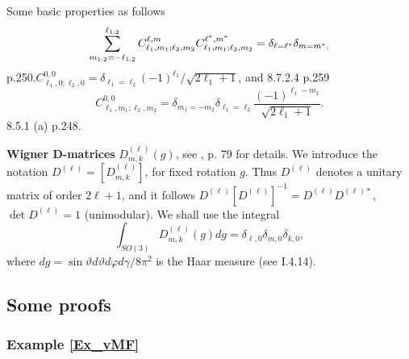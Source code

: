\documentclass[preprint,11pt,a4paper]{elsarticle}
\begin{document}
Some basic properties as follows 
\begin{equation*}
\sum_{m_{1:2}=-\ell_{1:2}}^{\ell_{1:2}}C_{\ell_{1},m_{1};\ell_{2},m_{2}}^{%
\ell,m}C_{\ell_{1},m_{1};\ell_{2},m_{2}}^{\ell^{\ast},m^{\ast}}=\delta
_{\ell=\ell^{\ast}}\delta_{m=m^{\ast},}
\end{equation*}
\cite{Varshalovich1988} p.250.$C_{\ell_{1},0;\ell_{2},0}^{0,0}=\delta
_{\ell_{1}=\ell_{2}}\left( -1\right) ^{\ell_{1}}/\sqrt{2\ell_{1}+1}$, and
8.7.2.4 p.259%
\begin{equation}
C_{\ell_{1},m_{1};\ell_{2},m_{2}}^{0,0}=\delta_{m_{1}=-m_{2}}\delta_{\ell
_{1}=\ell_{2}}\frac{\left( -1\right) ^{\ell_{1}-m_{1}}}{\sqrt{2\ell_{1}+1}}.
\label{Cl_Gord_00}
\end{equation}
\cite{Varshalovich1988} 8.5.1 (a) p.248.

\textbf{Wigner D-matrices} $D_{m,k}^{\left( \ell\right) }\left( g\right) $,
see \cite{Varshalovich1988}, p. 79 for details. We introduce the notation $%
D^{\left( \ell\right) }=\left[ D_{m,k}^{\left( \ell\right) }\right] $, for
fixed rotation $g$. Thus $D^{\left( \ell\right) }$ denotes a unitary matrix
of order $2\ell+1$, and it follows $D^{\left( \ell\right) }\left[ D^{\left(
\ell\right) }\right] ^{-1}=D^{\left( \ell\right) }D^{\left( \ell\right)
\ast} $, $\det D^{\left( \ell\right) }=1$ (unimodular). We shall use the
integral 
\begin{equation}
\int_{SO\left( 3\right) }D_{m,k}^{\left( \ell\right) }\left( g\right)
dg=\delta_{\ell,0}\delta_{m,0}\delta_{k,0},  \label{Int_D}
\end{equation}
where $dg=\sin\vartheta d\vartheta d\varphi d\gamma/8\pi^{2}$ is the Haar
measure (see \cite{SteinWeiss} I.4.14).

\subsection{Some proofs}

\subsubsection{Example \protect\ref{Ex_vMF} \label{Appendix_Proofs_vMF}}
\end{document}
